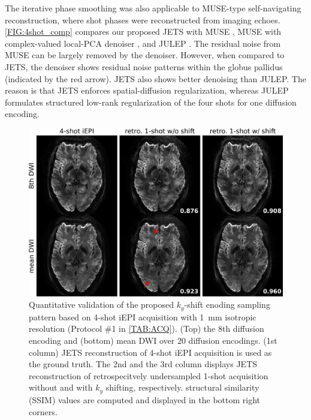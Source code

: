 \documentclass[preprint,12pt,authoryear,review]{elsarticle}
\begin{document}
    The iterative phase smoothing was also applicable to
    MUSE-type self-navigating reconstruction,
    where shot phases were
    reconstructed from imaging echoes.
    \cref{FIG:4shot_comp} compares our proposed JETS with
    MUSE \citep{chen_2013_muse},
    MUSE with complex-valued local-PCA denoiser
    \citep{cordero_2019_cplxdwi},
    and JULEP \citep{dai_2023_julep}.
    The residual noise from MUSE can be largely removed
    by the denoiser. However, when compared to JETS,
    the denoiser shows residual noise patterns within
    the globus pallidus (indicated by the red arrow).
    JETS also shows better denoising than JULEP.
    The reason is that JETS enforces spatial-diffusion regularization,
    whereas JULEP formulates structured low-rank regularization
    of the four shots for one diffusion encoding.


    \begin{figure}
        \centering
        \includegraphics[width=\textwidth]{../figures/fig5.png}
        \caption{Quantitative validation of the proposed
        $k_y$-shift enoding sampling pattern
        based on 4-shot iEPI acquisition with 1~mm isotropic resolution
        (Protocol \#1 in \cref{TAB:ACQ}).
        (Top) the 8th diffusion encoding and
        (bottom) mean DWI over 20 diffusion encodings.
        (1st column) JETS reconstruction of 4-shot iEPI acquisition
        is used as the ground truth.
        The 2nd and the 3rd column displays JETS reconstruction
        of retrospecitvely undersampled
        1-shot acquisition without and with $k_y$ shifting,
        respectively.
        structural similarity (SSIM) values are computed and
        displayed in the bottom right corners.}
        \label{FIG:retro}
    \end{figure}
\end{document}
